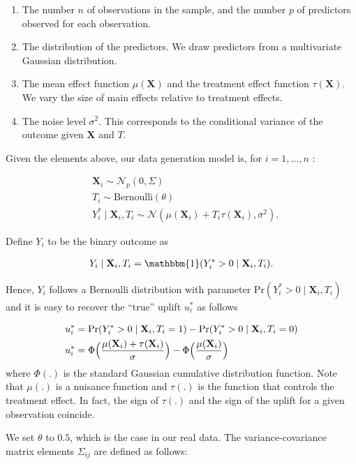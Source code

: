 \documentclass{article}
\def\X{\mathbf X}
\begin{document}
\begin{enumerate}
    \item The number $n$ of observations in the sample, and the number $p$ of predictors observed for each observation.
    \item The distribution of the predictors. We draw predictors from a multivariate Gaussian distribution.
    \item The mean effect function $\mu(\X)$ and the treatment effect function $\tau(\X)$. We vary the size of main effects relative to treatment effects.
    \item The noise level $\sigma^2$. This corresponds to the conditional variance of the outcome given $\X$ and $T$. 
\end{enumerate}

Given the elements above, our data generation model is, for $i=1,...,n$ :

\begin{align*}
    &\X_i \sim \mathcal{N}_p (0, \Sigma) \\
    &T_i \sim \mathrm{Bernoulli}(\theta)\\
    &Y_i^* \mid \X_i, T_i \sim \mathcal{N}(\mu(\X_i) + T_i\tau(\X_i), \sigma^2).
\end{align*}

Define $Y_i$ to be the binary outcome as

\begin{align*}
    Y_i \mid \X_i, T_i = \mathbbm{1}(Y_i^* > 0 \mid \X_i, T_i).
\end{align*}

Hence, $Y_i$ follows a Bernoulli distribution with parameter $\mathrm{Pr}(Y_i^* > 0 \mid \X_i, T_i)$ and it is easy to recover the ``true'' uplift $u_i^*$ as follows

\begin{align*}
    u_i^* &= \mathrm{Pr}(Y_i^* > 0 \mid \X_i, T_i = 1) - \mathrm{Pr}(Y_i^* > 0 \mid \X_i, T_i = 0)\\
    u_i^* &= \Phi \Bigl( \frac{\mu(\X_i) + \tau(\X_i)}{\sigma} \Bigr) - \Phi \Big( \frac{\mu(\X_i)}{\sigma} \Big) 
\end{align*}
where $\Phi(.)$ is the standard Gaussian cumulative distribution function. Note that $\mu(.)$ is a nuisance function and $\tau(.)$ is the function that controls the treatment effect. In fact, the sign of $\tau(.)$ and the sign of the uplift for a given observation coincide.

We set $\theta$ to $0.5$, which is the case in our real data. The variance-covariance matrix elements $\Sigma_{ij}$ are defined as follows:
\end{document}
